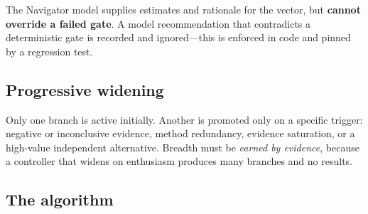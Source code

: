 \documentclass[11pt,a4paper]{article}
\begin{document}
The Navigator model supplies estimates and rationale for the vector, but
\textbf{cannot override a failed gate}. A model recommendation that contradicts
a deterministic gate is recorded and ignored---this is enforced in code and
pinned by a regression test.

\subsection{Progressive widening}

Only one branch is active initially. Another is promoted only on a specific
trigger: negative or inconclusive evidence, method redundancy, evidence
saturation, or a high-value independent alternative. Breadth must be
\emph{earned by evidence}, because a controller that widens on enthusiasm
produces many branches and no results.

\subsection{The algorithm}
\end{document}
